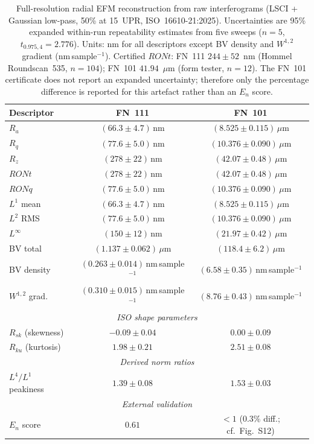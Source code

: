 \documentclass[review]{elsarticle}
\begin{document}
\begin{table}[htbp]
\centering
\footnotesize
\setlength{\tabcolsep}{4pt}
\caption{Full-resolution radial EFM reconstruction from raw interferograms (LSCI + Gaussian low-pass, 50\% at 15~UPR, ISO~16610-21:2025). Uncertainties are 95\% expanded within-run repeatability estimates from five sweeps ($n=5$, $t_{0.975,4}=2.776$). Units: nm for all descriptors except BV density and $W^{1,2}$ gradient (nm\,sample$^{-1}$). Certified $RONt$: FN~111 $244 \pm 52$~nm (Hommel Roundscan~535, $n=104$); FN~101 $41.94$~$\mu$m (form tester, $n=12$). The FN~101 certificate does not report an expanded uncertainty; therefore only the percentage difference is reported for this artefact rather than an $E_n$ score.}
\label{tab:metric_phase_reconstruction}
\begin{tabular}{lcc}
\toprule
Descriptor & FN~111 & FN~101 \\
\midrule
$R_a$ & $(66.3 \pm 4.7)$\,nm & $(8.525 \pm 0.115)$\,$\mu$m \\
$R_q$ & $(77.6 \pm 5.0)$\,nm & $(10.376 \pm 0.090)$\,$\mu$m \\
$R_z$ & $(278 \pm 22)$\,nm & $(42.07 \pm 0.48)$\,$\mu$m \\
$RONt$ & $(278 \pm 22)$\,nm & $(42.07 \pm 0.48)$\,$\mu$m \\
$RONq$ & $(77.6 \pm 5.0)$\,nm & $(10.376 \pm 0.090)$\,$\mu$m \\
$L^1$ mean & $(66.3 \pm 4.7)$\,nm & $(8.525 \pm 0.115)$\,$\mu$m \\
$L^2$ RMS & $(77.6 \pm 5.0)$\,nm & $(10.376 \pm 0.090)$\,$\mu$m \\
$L^{\infty}$ & $(150 \pm 12)$\,nm & $(21.97 \pm 0.42)$\,$\mu$m \\
BV total & $(1.137 \pm 0.062)$\,$\mu$m & $(118.4 \pm 6.2)$\,$\mu$m \\
BV density & $(0.263 \pm 0.014)$\,nm\,sample$^{-1}$ & $(6.58 \pm 0.35)$\,nm\,sample$^{-1}$ \\
$W^{1,2}$ grad. & $(0.310 \pm 0.015)$\,nm\,sample$^{-1}$ & $(8.76 \pm 0.43)$\,nm\,sample$^{-1}$ \\
\midrule
\multicolumn{3}{c}{\textit{ISO shape parameters}} \\
$R_{sk}$ (skewness) & $-0.09 \pm 0.04$ & $0.00 \pm 0.09$ \\
$R_{ku}$ (kurtosis) & $1.98 \pm 0.21$ & $2.51 \pm 0.08$ \\
\midrule
\multicolumn{3}{c}{\textit{Derived norm ratios}} \\
$L^4/L^1$ peakiness & $1.39 \pm 0.08$ & $1.53 \pm 0.03$ \\
\midrule
\multicolumn{3}{c}{\textit{External validation}} \\
$E_n$ score & $0.61$ & $<1$ ($0.3\%$ diff.; cf.~Fig.~S12) \\
\bottomrule
\end{tabular}
\end{table}
\end{document}
